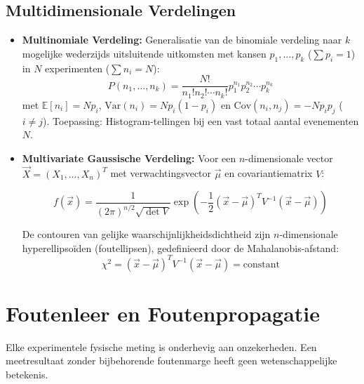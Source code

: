 \documentclass[11pt,a4paper]{article}
\newcommand{\E}{\mathbb{E}}
\newcommand{\Var}{\text{Var}}
\newcommand{\Cov}{\text{Cov}}
\begin{document}
\subsection{Multidimensionale Verdelingen}
\begin{itemize}[leftmargin=1.5em]
    \item \textbf{Multinomiale Verdeling:}
    Generalisatie van de binomiale verdeling naar $k$ mogelijke wederzijds uitsluitende uitkomsten met kansen $p_1, \ldots, p_k$ ($\sum p_i = 1$) in $N$ experimenten ($\sum n_i = N$):
    \begin{equation}
        P(n_1, \ldots, n_k) = \frac{N!}{n_1! n_2! \cdots n_k!} p_1^{n_1} p_2^{n_2} \cdots p_k^{n_k}
    \end{equation}
    met $\E[n_i] = N p_i$, $\Var(n_i) = N p_i (1 - p_i)$ en $\Cov(n_i, n_j) = -N p_i p_j$ ($i \neq j$). Toepassing: Histogram-tellingen bij een vast totaal aantal evenementen $N$.
    \item \textbf{Multivariate Gaussische Verdeling:}
    Voor een $n$-dimensionale vector $\vec{X} = (X_1, \ldots, X_n)^T$ met verwachtingsvector $\vec{\mu}$ en covariantiematrix $V$:
    \begin{formulabox}
    \begin{equation}
        f(\vec{x}) = \frac{1}{(2\pi)^{n/2} \sqrt{\det V}} \exp\left( -\frac{1}{2} (\vec{x} - \vec{\mu})^T V^{-1} (\vec{x} - \vec{\mu}) \right)
    \end{equation}
    \end{formulabox}
    De contouren van gelijke waarschijnlijkheidsdichtheid zijn $n$-dimensionale hyperellipsoïden (foutellipsen), gedefinieerd door de Mahalanobis-afstand:
    \begin{equation}
        \chi^2 = (\vec{x} - \vec{\mu})^T V^{-1} (\vec{x} - \vec{\mu}) = \text{constant}
    \end{equation}
\end{itemize}


\section{Foutenleer en Foutenpropagatie}

Elke experimentele fysische meting is onderhevig aan onzekerheden. Een meetresultaat zonder bijbehorende foutenmarge heeft geen wetenschappelijke betekenis.
\end{document}
